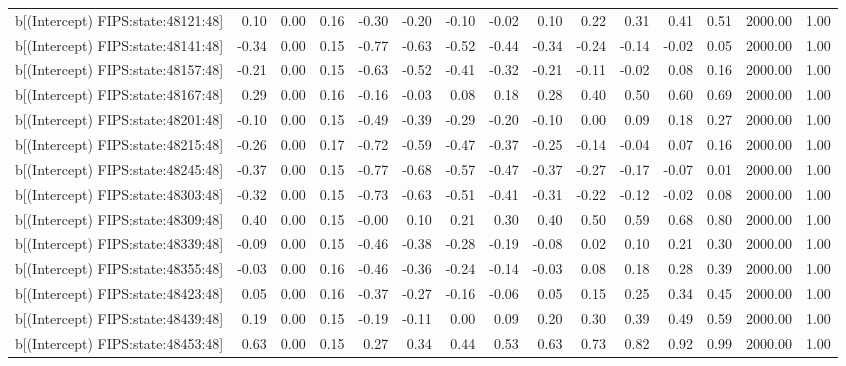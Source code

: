 \begin{table}[ht]
\begin{tabular}{rrrrrrrrrrrrrrr}
  b[(Intercept) FIPS:state:48121:48] & 0.10 & 0.00 & 0.16 & -0.30 & -0.20 & -0.10 & -0.02 & 0.10 & 0.22 & 0.31 & 0.41 & 0.51 & 2000.00 & 1.00 \\ 
  b[(Intercept) FIPS:state:48141:48] & -0.34 & 0.00 & 0.15 & -0.77 & -0.63 & -0.52 & -0.44 & -0.34 & -0.24 & -0.14 & -0.02 & 0.05 & 2000.00 & 1.00 \\ 
  b[(Intercept) FIPS:state:48157:48] & -0.21 & 0.00 & 0.15 & -0.63 & -0.52 & -0.41 & -0.32 & -0.21 & -0.11 & -0.02 & 0.08 & 0.16 & 2000.00 & 1.00 \\ 
  b[(Intercept) FIPS:state:48167:48] & 0.29 & 0.00 & 0.16 & -0.16 & -0.03 & 0.08 & 0.18 & 0.28 & 0.40 & 0.50 & 0.60 & 0.69 & 2000.00 & 1.00 \\ 
  b[(Intercept) FIPS:state:48201:48] & -0.10 & 0.00 & 0.15 & -0.49 & -0.39 & -0.29 & -0.20 & -0.10 & 0.00 & 0.09 & 0.18 & 0.27 & 2000.00 & 1.00 \\ 
  b[(Intercept) FIPS:state:48215:48] & -0.26 & 0.00 & 0.17 & -0.72 & -0.59 & -0.47 & -0.37 & -0.25 & -0.14 & -0.04 & 0.07 & 0.16 & 2000.00 & 1.00 \\ 
  b[(Intercept) FIPS:state:48245:48] & -0.37 & 0.00 & 0.15 & -0.77 & -0.68 & -0.57 & -0.47 & -0.37 & -0.27 & -0.17 & -0.07 & 0.01 & 2000.00 & 1.00 \\ 
  b[(Intercept) FIPS:state:48303:48] & -0.32 & 0.00 & 0.15 & -0.73 & -0.63 & -0.51 & -0.41 & -0.31 & -0.22 & -0.12 & -0.02 & 0.08 & 2000.00 & 1.00 \\ 
  b[(Intercept) FIPS:state:48309:48] & 0.40 & 0.00 & 0.15 & -0.00 & 0.10 & 0.21 & 0.30 & 0.40 & 0.50 & 0.59 & 0.68 & 0.80 & 2000.00 & 1.00 \\ 
  b[(Intercept) FIPS:state:48339:48] & -0.09 & 0.00 & 0.15 & -0.46 & -0.38 & -0.28 & -0.19 & -0.08 & 0.02 & 0.10 & 0.21 & 0.30 & 2000.00 & 1.00 \\ 
  b[(Intercept) FIPS:state:48355:48] & -0.03 & 0.00 & 0.16 & -0.46 & -0.36 & -0.24 & -0.14 & -0.03 & 0.08 & 0.18 & 0.28 & 0.39 & 2000.00 & 1.00 \\ 
  b[(Intercept) FIPS:state:48423:48] & 0.05 & 0.00 & 0.16 & -0.37 & -0.27 & -0.16 & -0.06 & 0.05 & 0.15 & 0.25 & 0.34 & 0.45 & 2000.00 & 1.00 \\ 
  b[(Intercept) FIPS:state:48439:48] & 0.19 & 0.00 & 0.15 & -0.19 & -0.11 & 0.00 & 0.09 & 0.20 & 0.30 & 0.39 & 0.49 & 0.59 & 2000.00 & 1.00 \\ 
  b[(Intercept) FIPS:state:48453:48] & 0.63 & 0.00 & 0.15 & 0.27 & 0.34 & 0.44 & 0.53 & 0.63 & 0.73 & 0.82 & 0.92 & 0.99 & 2000.00 & 1.00 \\ 

\end{tabular}
\end{table}
